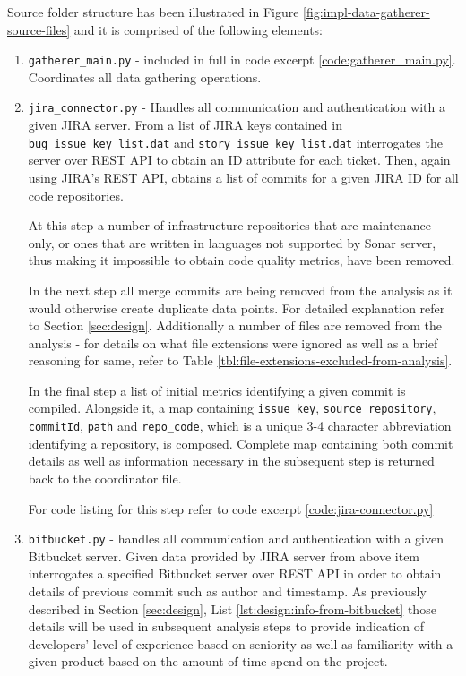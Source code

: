 Source folder structure has been illustrated in Figure \ref{fig:impl-data-gatherer-source-files} and it is comprised of the following elements:
\begin{enumerate}
    \item \texttt{gatherer\_main.py} - included in full in code excerpt \ref{code:gatherer_main.py}. Coordinates all data gathering operations. 
    \item\label{lst:impl.item:jira} \texttt{jira\_connector.py} - Handles all communication and authentication with a given JIRA server. From a list of JIRA keys contained in \texttt{bug\_issue\_key\_list.dat} and \texttt{story\_issue\_key\_list.dat} interrogates the server over REST API to obtain an ID attribute for each ticket. Then, again using JIRA's REST API, obtains a list of commits for a given JIRA ID for all code repositories. 
    
    At this step a number of infrastructure repositories that are maintenance only, or ones that are written in languages not supported by Sonar server, thus making it impossible to obtain code quality metrics, have been removed.
    
    In the next step all merge commits are being removed from the analysis as it would otherwise create duplicate data points. For detailed explanation refer to Section \ref{sec:design}. Additionally a number of files are removed from the analysis - for details on what file extensions were ignored as well as a brief reasoning for same, refer to Table \ref{tbl:file-extensions-excluded-from-analysis}.
    
    In the final step a list of initial metrics identifying a given commit is compiled. Alongside it, a map containing \texttt{issue\_key}, \texttt{source\_repository}, \texttt{commitId}, \texttt{path} and \texttt{repo\_code}, which is a unique 3-4 character abbreviation identifying a repository, is composed. Complete map containing both commit details as well as information necessary in the subsequent step is returned back to the coordinator file. 
    
    For code listing for this step refer to code excerpt \ref{code:jira-connector.py}
    
    \item\label{lst:impl.item:bitbucket} \texttt{bitbucket.py} - handles all communication and authentication with a given Bitbucket server. Given data provided by JIRA server from above item interrogates a specified Bitbucket server over REST API in order to obtain details of previous commit such as author and timestamp. As previously described in Section \ref{sec:design}, List \ref{lst:design:info-from-bitbucket} those details will be used in subsequent analysis steps to provide indication of developers' level of experience based on seniority as well as familiarity with a given product based on the amount of time spend on the project.
    

\end{enumerate}
